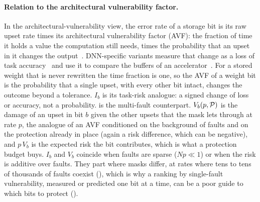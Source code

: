\paragraph{Relation to the architectural vulnerability factor.} In the architectural-vulnerability view, the error rate of a storage bit is its raw upset rate times its architectural vulnerability factor (AVF): the fraction of time it holds a value the computation still needs, times the probability that an upset in it changes the output~\cite{mukherjee2003avf}. DNN-specific variants measure that change as a loss of task accuracy~\cite{tyagi2023thales} and use it to compare the buffers of an accelerator~\cite{li2017understanding}. For a stored weight that is never rewritten the time fraction is one, so the AVF of a weight bit is the probability that a single upset, with every other bit intact, changes the outcome beyond a tolerance. $I_b$ is its task-risk analogue: a signed change of loss or accuracy, not a probability.  is the multi-fault counterpart. $V_b(p,\mathcal{P})$ is the damage of an upset in bit $b$ given the other upsets that the mask lets through at rate $p$, the analogue of an AVF conditioned on the background of faults and on the protection already in place (again a risk difference, which can be negative), and $p\,V_b$ is the expected risk the bit contributes, which is what a protection budget buys. $I_b$ and $V_b$ coincide when faults are sparse ($Np\ll1$) or when the risk is additive over faults. They part where masks differ, at rates where tens to tens of thousands of faults coexist (), which is why a ranking by single-fault vulnerability, measured or predicted one bit at a time, can be a poor guide to which bits to protect ().

